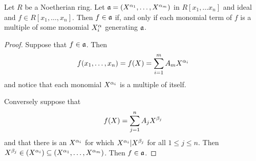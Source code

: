 \begin{proposition}\label{proposition_7.6.3}
  Let $R$ be a Noetherian ring. Let $\mathfrak{a}=(X^{\alpha_1}, \dots, X^{\alpha_m})$ in $R[x_1,
  \dots x_n]$ and ideal and $f \in R[x_1, \dots, x_n]$. Then $f \in
  \mathfrak{a}$ if, and only if each monomial term of $f$ is a multiple of some
  monomial  $X^\alpha_i$ generating $\mathfrak{a}$.
\end{proposition}
\begin{proof}
  Suppose that $f \in \mathfrak{a}$. Then
  \begin{equation*}
    f(x_1, \dots, x_n)=f(X)=\sum_{i=1}^m{A_mX^{\alpha_i}}
  \end{equation*}
  and notice that each monomial $X^{\alpha_i}$ is a multiple of itself.

  Conversely suppose that
  \begin{equation*}
    f(X)=\sum_{j=1}^n{A_jX^{\beta_j}}
  \end{equation*}
  and that there is an $X^{\alpha_i}$ for which $X^{\alpha_i}|X^{\beta_j}$ for
  all $1 \leq j \leq n$. Then $X^{\beta_j} \in (X^{\alpha_i}) \subseteq
  (X^{\alpha_1}, \dots, X^{\alpha_m})$. Then $f \in \mathfrak{a}$.
\end{proof}

